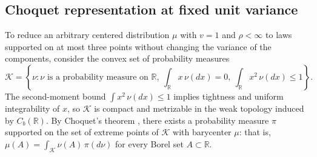 \documentclass[11pt]{article}
\numberwithin{equation}{section}
\theoremstyle{remark}
\newcommand{\R}{\mathbb R}
\begin{document}
\subsection{Choquet representation at fixed unit variance}\label{sec:choquet}

To reduce an arbitrary centered distribution $\mu$ with $v=1$ and $\rho<\infty$
to laws supported on at most three points without changing the variance of the
components, consider the convex set of probability measures
\[
 \mathcal K=\left\{\nu:\nu\text{ is a probability measure on }\R,
         \ \int_\R x\,\nu(dx)=0,\ \int_\R x^2\,\nu(dx)\le1\right\}.
\]
The second-moment bound $\int x^2\,\nu(dx)\le1$ implies tightness and uniform
integrability of $x$, so $\mathcal K$ is compact and metrizable in the weak
topology induced by $C_b(\R)$. By Choquet's theorem
\citep[pp.~333--337, Corollary~2 and Lemma~5]{Choquet1960}, there exists a
probability measure $\pi$ supported on the set of extreme points of
$\mathcal K$ with barycenter $\mu$: that is, $\mu(A)=\int_{\mathcal K}\nu(A)\,\pi(d\nu)$
for every Borel set $A\subset\R$.
\end{document}
